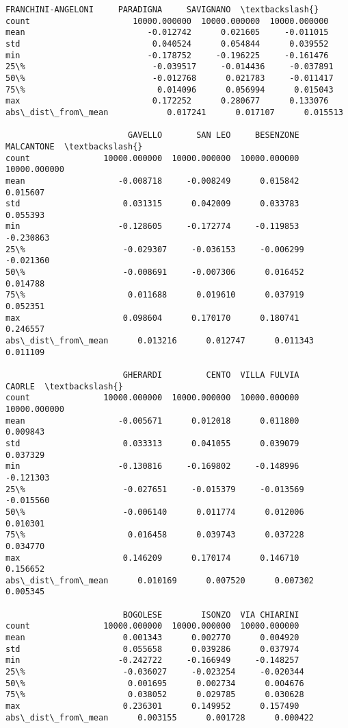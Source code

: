 \documentclass[11pt]{article}
\begin{document}
\begin{tcolorbox}[breakable, size=fbox, boxrule=.5pt, pad at break*=1mm, opacityfill=0]
\begin{Verbatim}[commandchars=\\\{\}]
                    FRANCHINI-ANGELONI     PARADIGNA     SAVIGNANO  \textbackslash{}
count                     10000.000000  10000.000000  10000.000000
mean                         -0.012742      0.021605     -0.011015
std                           0.040524      0.054844      0.039552
min                          -0.178752     -0.196225     -0.161476
25\%                          -0.039517     -0.014436     -0.037891
50\%                          -0.012768      0.021783     -0.011417
75\%                           0.014096      0.056994      0.015043
max                           0.172252      0.280677      0.133076
abs\_dist\_from\_mean            0.017241      0.017107      0.015513

                         GAVELLO       SAN LEO     BESENZONE    MALCANTONE  \textbackslash{}
count               10000.000000  10000.000000  10000.000000  10000.000000
mean                   -0.008718     -0.008249      0.015842      0.015607
std                     0.031315      0.042009      0.033783      0.055393
min                    -0.128605     -0.172774     -0.119853     -0.230863
25\%                    -0.029307     -0.036153     -0.006299     -0.021360
50\%                    -0.008691     -0.007306      0.016452      0.014788
75\%                     0.011688      0.019610      0.037919      0.052351
max                     0.098604      0.170170      0.180741      0.246557
abs\_dist\_from\_mean      0.013216      0.012747      0.011343      0.011109

                        GHERARDI         CENTO  VILLA FULVIA        CAORLE  \textbackslash{}
count               10000.000000  10000.000000  10000.000000  10000.000000
mean                   -0.005671      0.012018      0.011800      0.009843
std                     0.033313      0.041055      0.039079      0.037329
min                    -0.130816     -0.169802     -0.148996     -0.121303
25\%                    -0.027651     -0.015379     -0.013569     -0.015560
50\%                    -0.006140      0.011774      0.012006      0.010301
75\%                     0.016458      0.039743      0.037228      0.034770
max                     0.146209      0.170174      0.146710      0.156652
abs\_dist\_from\_mean      0.010169      0.007520      0.007302      0.005345

                        BOGOLESE        ISONZO  VIA CHIARINI
count               10000.000000  10000.000000  10000.000000
mean                    0.001343      0.002770      0.004920
std                     0.055658      0.039286      0.037974
min                    -0.242722     -0.166949     -0.148257
25\%                    -0.036027     -0.023254     -0.020344
50\%                     0.001695      0.002734      0.004676
75\%                     0.038052      0.029785      0.030628
max                     0.236301      0.149952      0.157490
abs\_dist\_from\_mean      0.003155      0.001728      0.000422
\end{Verbatim}
\end{tcolorbox}
        
\end{document}
